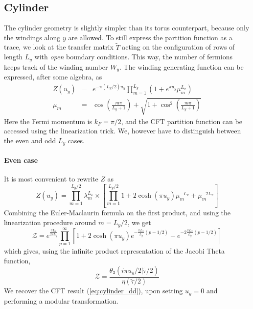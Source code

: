 \documentclass[11pt]{iopart}
\begin{document}
\subsection[\;\;\;\;\;\;\;\;\;\;\;\;\;\; Cylinder]{Cylinder}
The cylinder geometry is slightly simpler than its torus counterpart, because only the windings along $y$ are allowed. To still express the partition function as a trace, we look at the transfer matrix $\tilde{T}$ acting on the configuration of rows of length $L_y$ with \emph{open} boundary conditions. This way, the number of fermions keeps track of the winding number $W_y$. The winding generating function can be expressed, after some algebra, as
\begin{eqnarray}
 Z(u_y)&=&e^{-\pi (L_y/2)u_y}\prod_{m=1}^{L_y} \left(1+e^{\pi u_y}\mu_m^{L_x}\right)\\
 \mu_m&=&\cos \left(\frac{m \pi}{L_y+1}\right)+\sqrt{1+\cos^2\left(\frac{m \pi}{L_y+1}\right)}
\end{eqnarray}
Here the Fermi momentum is $k_F=\pi/2$, and the CFT partition function can be accessed using the linearization trick. We, however have to distinguish between the even and odd $L_y$ cases.
\paragraph{Even case}
It is most convenient to rewrite $Z$ as
\begin{equation}
Z(u_y)=\prod_{m=1}^{L_y/2} \lambda_m^{L_x}\times \left[\prod_{m=1}^{L_y/2} 1+2\cosh (\pi u_y)\mu_m^{-L_x}+\mu_m^{-2L_x}\right] 
\end{equation}
Combining the Euler-Maclaurin formula on the first product, and using the linearization procedure around $m=L_y/2$, we get
\begin{equation}
 \mathcal{Z}= e^{\frac{\pi L_x}{24 L_y}}\prod_{p=1}^{\infty}\left[1+2 \cosh (\pi u_y)e^{-\frac{\pi L_x}{L_y}(p-1/2)}+e^{-2\frac{\pi L_x}{L_y}(p-1/2)}\right]
\end{equation}
which gives, using the infinite product representation of the Jacobi Theta function,
\begin{equation}
 \mathcal{Z}=\frac{\theta_3(i \pi u_y/2|\tilde{\tau}/2)}{\eta(\tilde{\tau}/2)}
\end{equation}
We recover the CFT result (\ref{eq:cylinder_dd}), upon setting $u_y=0$ and performing a modular transformation. 
\end{document}

